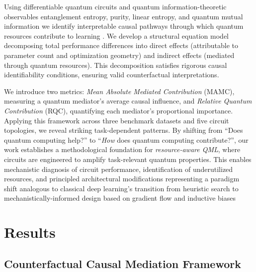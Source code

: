\documentclass[
    reprint,
    amsmath, amssymb,
    aps,
    floatfix,
    nofootinbib
]{revtex4-1}
\begin{document}
Using differentiable quantum circuits \cite{mitarai2018quantum} and quantum information-theoretic observables entanglement entropy, purity, linear entropy, and quantum mutual information we identify interpretable causal pathways through which quantum resources contribute to learning \cite{schuld2021effect}. We develop a structural equation model decomposing total performance differences into direct effects (attributable to parameter count and optimization geometry) and indirect effects (mediated through quantum resources). This decomposition satisfies rigorous causal identifiability conditions, ensuring valid counterfactual interpretations.

We introduce two metrics: \emph{Mean Absolute Mediated Contribution} (MAMC), measuring a quantum mediator's average causal influence, and \emph{Relative Quantum Contribution} (RQC), quantifying each mediator's proportional importance. Applying this framework across three benchmark datasets and five circuit topologies, we reveal striking task-dependent patterns. By shifting from ``Does quantum computing help?''\cite{schuld2022quantum, cerezo2022challenges, huang2021information} to ``\emph{How} does quantum computing contribute?'', our work establishes a methodological foundation for \emph{resource-aware QML}, where circuits are engineered to amplify task-relevant quantum properties. This enables mechanistic diagnosis of circuit performance, identification of underutilized resources, and principled architectural modifications representing a paradigm shift analogous to classical deep learning's transition from heuristic search to mechanistically-informed design based on gradient flow and inductive biases \cite{gil2024understanding,nakhl2024calibrating}
\section{Results}

\subsection{Counterfactual Causal Mediation Framework}
\end{document}
